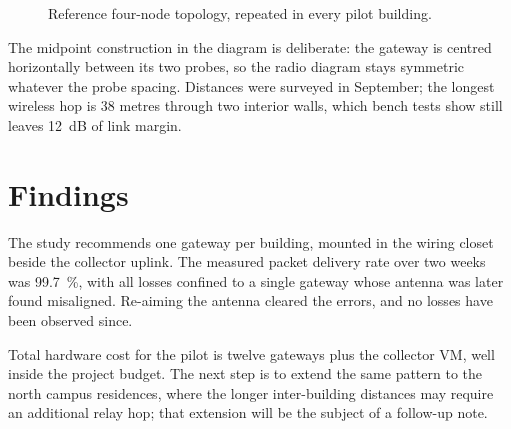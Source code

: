 \documentclass[11pt]{article}
\begin{document}
\begin{figure}[htbp]
\centering
{}
\caption{Reference four-node topology, repeated in every pilot building.}
\label{fig:topology}
\end{figure}

The midpoint construction in the diagram is deliberate: the gateway is
centred horizontally between its two probes, so the radio diagram stays
symmetric whatever the probe spacing. Distances were surveyed in
September; the longest wireless hop is 38 metres through two interior
walls, which bench tests show still leaves 12~dB of link margin.

\section{Findings}
The study recommends one gateway per building, mounted in the wiring
closet beside the collector uplink. The measured packet delivery rate
over two weeks was 99.7~\%, with all losses confined to a single
gateway whose antenna was later found misaligned. Re-aiming the
antenna cleared the errors, and no losses have been observed since.

Total hardware cost for the pilot is twelve gateways plus the
collector VM, well inside the project budget. The next step is to
extend the same pattern to the north campus residences, where the
longer inter-building distances may require an additional relay hop;
that extension will be the subject of a follow-up note.
\end{document}
